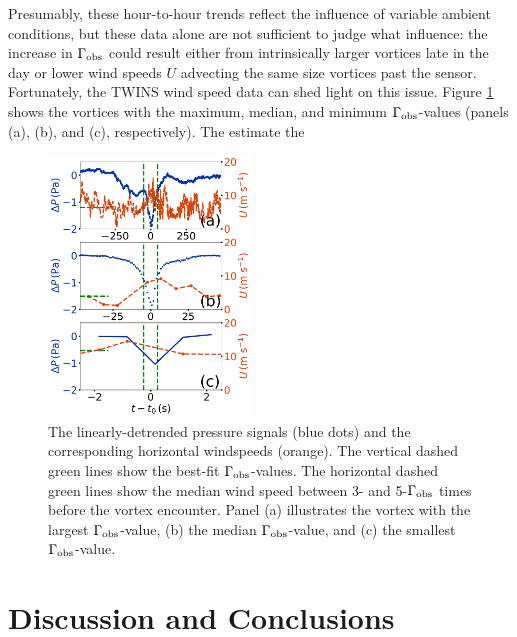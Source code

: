 \documentclass{aastex63}
\begin{document}
Presumably, these hour-to-hour trends reflect the influence of variable ambient conditions, but these data alone are not sufficient to judge what influence: the increase in $\Gamma_{\rm obs}$ could result either from intrinsically larger vortices late in the day or lower wind speeds $U$ advecting the same size vortices past the sensor. Fortunately, the TWINS wind speed data can shed light on this issue. Figure \ref{fig:vortices_and_windspeed} shows the vortices with the maximum, median, and minimum $\Gamma_{\rm obs}$-values (panels (a), (b), and (c), respectively). The estimate the 

\begin{figure}
\includegraphics[width=0.48\textwidth]{figures/vortices_and_windspeed.png}
\caption{The linearly-detrended pressure signals (blue dots) and the corresponding horizontal windspeeds (orange). The vertical dashed green lines show the best-fit $\Gamma_{\rm obs}$-values. The horizontal dashed green lines show the median wind speed between 3- and 5-$\Gamma_{\rm obs}$ times before the vortex encounter. Panel (a) illustrates the vortex with the largest $\Gamma_{\rm obs}$-value, (b) the median $\Gamma_{\rm obs}$-value, and (c) the smallest $\Gamma_{\rm obs}$-value.\label{fig:vortices_and_windspeed}}
\end{figure}

\section{Discussion and Conclusions}
\label{sec:Discussion and Conclusions}
\end{document}

